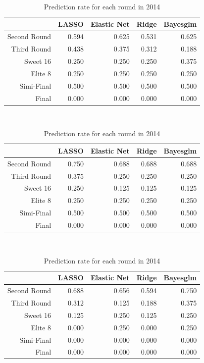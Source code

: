 \documentclass{article} %
\begin{document}
\begin{table}[H]
\centering
{\small
\begin{tabular}{rrrrr}
  \hline
 & LASSO & Elastic Net & Ridge & Bayesglm \\ 
  \hline
Second Round & 0.594 & 0.625 & 0.531 & 0.625 \\ 
  Third Round & 0.438 & 0.375 & 0.312 & 0.188 \\ 
  Sweet 16 & 0.250 & 0.250 & 0.250 & 0.375 \\ 
  Elite 8 & 0.250 & 0.250 & 0.250 & 0.250 \\ 
  Simi-Final & 0.500 & 0.500 & 0.500 & 0.500 \\ 
  Final & 0.000 & 0.000 & 0.000 & 0.000 \\ 
   \hline
\end{tabular}
}
\caption{Prediction rate for each round in 2012}\ 

\centering
{\small
\begin{tabular}{rrrrr}
  \hline
 & LASSO & Elastic Net & Ridge & Bayesglm \\ 
  \hline
Second Round & 0.750 & 0.688 & 0.688 & 0.688 \\ 
  Third Round & 0.375 & 0.250 & 0.250 & 0.250 \\ 
  Sweet 16 & 0.250 & 0.125 & 0.125 & 0.125 \\ 
  Elite 8 & 0.250 & 0.250 & 0.250 & 0.250 \\ 
  Simi-Final & 0.500 & 0.500 & 0.500 & 0.500 \\ 
  Final & 0.000 & 0.000 & 0.000 & 0.000 \\ 
   \hline
\end{tabular}
}
\caption{Prediction rate for each round in 2013}\ 

\centering
{\small
\begin{tabular}{rrrrr}
  \hline
 & LASSO & Elastic Net & Ridge & Bayesglm \\ 
  \hline
Second Round & 0.688 & 0.656 & 0.594 & 0.750 \\ 
  Third Round & 0.312 & 0.125 & 0.188 & 0.375 \\ 
  Sweet 16 & 0.125 & 0.250 & 0.125 & 0.250 \\ 
  Elite 8 & 0.000 & 0.250 & 0.000 & 0.250 \\ 
  Simi-Final & 0.000 & 0.000 & 0.000 & 0.000 \\ 
  Final & 0.000 & 0.000 & 0.000 & 0.000 \\ 
   \hline
\end{tabular}
}
\caption{Prediction rate for each round in 2014}\ 


\end{table}
\end{document}

